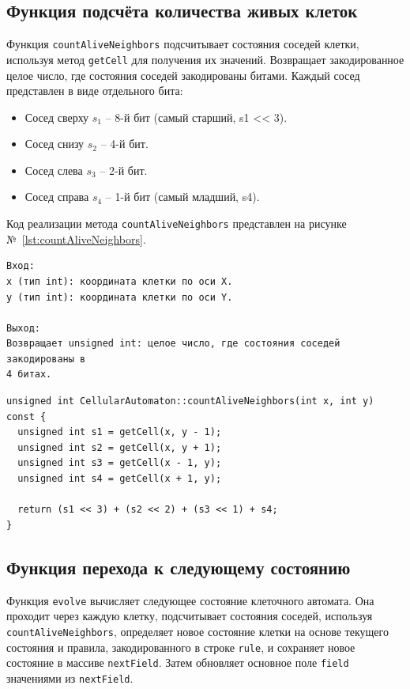 \documentclass[a4paper, final]{article}
\begin{document}
\subsection{Функция подсчёта количества живых клеток}
Функция \texttt{countAliveNeighbors} подсчитывает состояния соседей клетки, используя метод \texttt{getCell} 
для получения их значений. Возвращает закодированное целое число, где состояния соседей закодированы битами.
Каждый сосед представлен в виде отдельного бита:
\begin{itemize}
  \item Сосед сверху $s_1$ -- 8-й бит (самый старший, s1 << 3).
  \item Сосед снизу $s_2$ -- 4-й бит.
  \item Сосед слева $s_3$ -- 2-й бит.
  \item Сосед справа $s_4$ -- 1-й бит (самый младший, s4).
\end{itemize}

Код реализации метода \texttt{countAliveNeighbors} представлен на рисунке №~\ref{lst:countAliveNeighbors}.

\begin{verbatim}
Вход:
x (тип int): координата клетки по оси X.
y (тип int): координата клетки по оси Y.

Выход:
Возвращает unsigned int: целое число, где состояния соседей закодированы в
4 битах.
\end{verbatim}

\begin{lstlisting}[caption={Код реализации метода \texttt{countAliveNeighbors}}, label={lst:countAliveNeighbors}]
unsigned int CellularAutomaton::countAliveNeighbors(int x, int y) const {
  unsigned int s1 = getCell(x, y - 1);
  unsigned int s2 = getCell(x, y + 1);
  unsigned int s3 = getCell(x - 1, y);
  unsigned int s4 = getCell(x + 1, y);

  return (s1 << 3) + (s2 << 2) + (s3 << 1) + s4;
}
\end{lstlisting}

\subsection{Функция перехода к следующему состоянию}
Функция \texttt{evolve} вычисляет следующее состояние клеточного автомата. Она проходит через каждую клетку, 
подсчитывает состояния соседей, используя \texttt{countAliveNeighbors}, определяет новое состояние клетки на 
основе текущего состояния и правила, закодированного в строке \texttt{rule}, и сохраняет новое состояние в массиве 
\texttt{nextField}. Затем обновляет основное поле \texttt{field} значениями из \texttt{nextField}.
\end{document}
